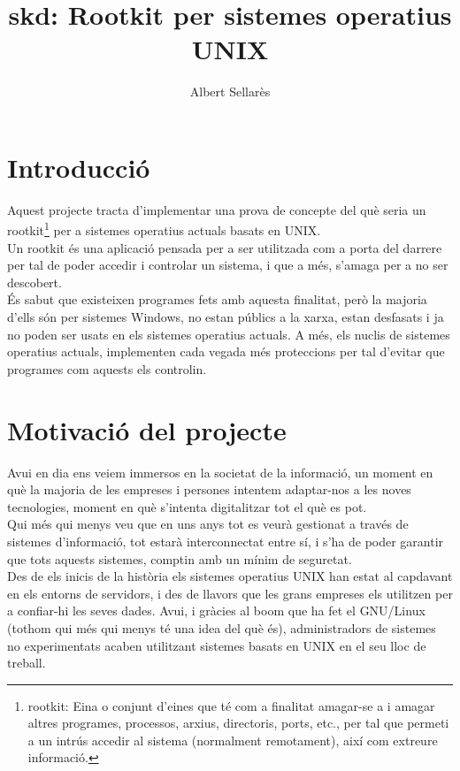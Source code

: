\documentclass[a4paper]{article}
\author{Albert Sellarès}
\title{skd: Rootkit per sistemes operatius UNIX}
\begin{document}
\maketitle
\newpage


\section{Introducció}

Aquest projecte tracta d'implementar una prova de concepte del què seria un rootkit\footnote{rootkit:
Eina o conjunt d'eines que té com a finalitat amagar-se a i amagar altres programes, processos, arxius, 
directoris, ports, etc., per tal que permeti a un intrús accedir al sistema (normalment remotament), 
així com extreure informació.} per a sistemes operatius actuals basats en UNIX.\\ 
Un rootkit és una aplicació pensada per a ser utilitzada com a porta del darrere per tal de
poder accedir i controlar un sistema, i que a més, s'amaga per a no ser descobert.\\
És sabut que existeixen programes fets amb aquesta finalitat, però la majoria d'ells són
per sistemes Windows, no estan públics a la xarxa, estan desfasats i ja no poden ser
usats en els sistemes operatius actuals. A més, els nuclis de sistemes operatius actuals, implementen cada vegada més
proteccions per tal d'evitar que programes com aquests els controlin.

\section{Motivació del projecte}

Avui en dia ens veiem immersos en la societat de la informació, un moment en què la
majoria de les empreses i persones intentem adaptar-nos a les noves tecnologies,
moment en què s'intenta digitalitzar tot el què es pot.\\
Qui més qui menys veu que en uns anys tot es veurà gestionat a través de sistemes
d'informació, tot estarà interconnectat entre sí, i s'ha de poder garantir que tots aquests
sistemes, comptin amb un mínim de seguretat.\\
Des de els inicis de la història els sistemes operatius UNIX han estat al capdavant en els
entorns de servidors, i des de llavors que les grans empreses els utilitzen per a confiar-hi
les seves dades. Avui, i gràcies al boom que ha fet el GNU/Linux (tothom qui més qui
menys té una idea del què és), administradors de sistemes no experimentats acaben
utilitzant sistemes basats en UNIX en el seu lloc de treball.
\end{document}
